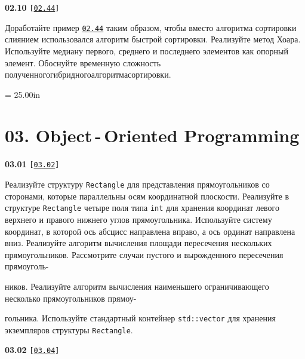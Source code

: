 \documentclass[a4paper,12pt]{article}
\begin{document}
\bigskip

{\large \textbf{02.10} \texttt{[\href{https://github.com/i-s-m-mipt/Education/blob/master/projects/examples/source/02.44.cpp}{\texttt{02.44}}]}}

\bigskip

Доработайте пример \href{https://github.com/i-s-m-mipt/Education/blob/master/projects/examples/source/02.44.cpp}{\texttt{02.44}} таким образом, чтобы вместо алгоритма сортировки слиянием использовался алгоритм быстрой сортировки. Реализуйте метод Хоара. Используйте медиану первого, среднего и последнего элементов как опорный элемент. Обоснуйте временную сложность полученного\;гибридного\;алгоритма\;сортировки.



\newpage\thispagestyle{empty}\pdfpageheight = 25.00in\enlargethispage{100in}

\section{03. Object\,-\,Oriented Programming}

{\large \textbf{03.01} \texttt{[\href{https://github.com/i-s-m-mipt/Education/blob/master/projects/examples/source/03.02.cpp}{\texttt{03.02}}]}}

\bigskip

Реализуйте структуру \lstinline{Rectangle} для представления прямоугольников со сторонами, которые параллельны осям координатной плоскости. Реализуйте в структуре \lstinline{Rectangle} четыре поля типа \lstinline{int} для хранения координат левого верхнего и правого нижнего углов прямоугольника. Используйте систему координат, в которой ось абсцисс направлена вправо, а ось ординат направлена вниз. Реализуйте алгоритм вычисления площади пересечения нескольких прямоугольников. Рассмотрите случаи пустого и вырожденного пересечения прямоуголь- 

ников. Реализуйте алгоритм вычисления наименьшего ограничивающего несколько прямоугольников прямоу-

гольника. Используйте стандартный контейнер \lstinline{std::vector} для хранения экземпляров структуры \lstinline{Rectangle}.

\bigskip

{\large \textbf{03.02} \texttt{[\href{https://github.com/i-s-m-mipt/Education/blob/master/projects/examples/source/03.04.cpp}{\texttt{03.04}}]}}

\bigskip
\end{document}
